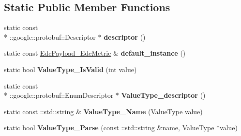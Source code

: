 \subsection*{Static Public Member Functions}
\begin{DoxyCompactItemize}
\item 
\hypertarget{classedcdatatypes_1_1_edc_payload___edc_metric_ae943a2362554e5c5ad5bb024499e8831}{static const \\*
\-::google\-::protobuf\-::\-Descriptor $\ast$ {\bfseries descriptor} ()}\label{classedcdatatypes_1_1_edc_payload___edc_metric_ae943a2362554e5c5ad5bb024499e8831}

\item 
\hypertarget{classedcdatatypes_1_1_edc_payload___edc_metric_a488b43741469ca513fbf42fde4b8f035}{static const \hyperlink{classedcdatatypes_1_1_edc_payload___edc_metric}{Edc\-Payload\-\_\-\-Edc\-Metric} \& {\bfseries default\-\_\-instance} ()}\label{classedcdatatypes_1_1_edc_payload___edc_metric_a488b43741469ca513fbf42fde4b8f035}

\item 
\hypertarget{classedcdatatypes_1_1_edc_payload___edc_metric_a644da3aae697275eba52d1342881453a}{static bool {\bfseries Value\-Type\-\_\-\-Is\-Valid} (int value)}\label{classedcdatatypes_1_1_edc_payload___edc_metric_a644da3aae697275eba52d1342881453a}

\item 
\hypertarget{classedcdatatypes_1_1_edc_payload___edc_metric_a6253948f46801a011fc55b633e5c5b62}{static const \\*
\-::google\-::protobuf\-::\-Enum\-Descriptor $\ast$ {\bfseries Value\-Type\-\_\-descriptor} ()}\label{classedcdatatypes_1_1_edc_payload___edc_metric_a6253948f46801a011fc55b633e5c5b62}

\item 
\hypertarget{classedcdatatypes_1_1_edc_payload___edc_metric_a138faafcd00aedc173752b2483e41fba}{static const \-::std\-::string \& {\bfseries Value\-Type\-\_\-\-Name} (Value\-Type value)}\label{classedcdatatypes_1_1_edc_payload___edc_metric_a138faafcd00aedc173752b2483e41fba}

\item 
\hypertarget{classedcdatatypes_1_1_edc_payload___edc_metric_a3fe99d5c0b3f51553ac6f8a0a8b09331}{static bool {\bfseries Value\-Type\-\_\-\-Parse} (const \-::std\-::string \&name, Value\-Type $\ast$value)}\label{classedcdatatypes_1_1_edc_payload___edc_metric_a3fe99d5c0b3f51553ac6f8a0a8b09331}

\end{DoxyCompactItemize}
